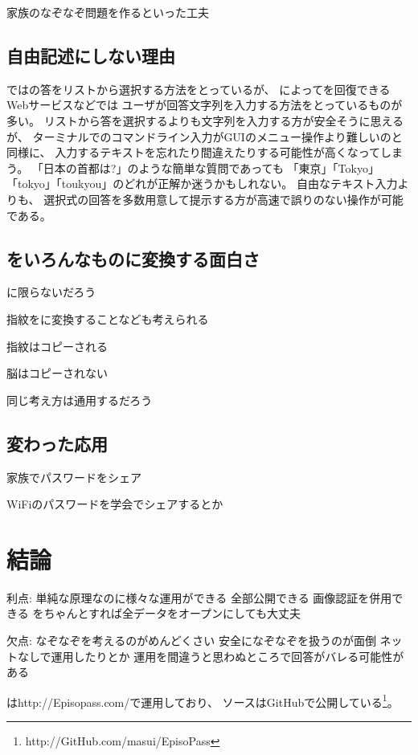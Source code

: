 \documentclass[twoside]{wiss}
\begin{document}
家族のなぞなぞ問題を作るといった工夫

\subsection{自由記述にしない理由}

{\EP}では{\SQ}の答をリストから選択する方法をとっているが、
{\SQ}によって{\PW}を回復できるWebサービスなどでは
ユーザが回答文字列を入力する方法をとっているものが多い。
リストから答を選択するよりも文字列を入力する方が安全そうに思えるが、
ターミナルでのコマンドライン入力がGUIのメニュー操作より難しいのと同様に、
入力するテキストを忘れたり間違えたりする可能性が高くなってしまう。
「日本の首都は?」のような簡単な質問であっても
「東京」「Tokyo」「tokyo」「toukyou」のどれが正解か迷うかもしれない。
自由なテキスト入力よりも、
選択式の回答を多数用意して提示する方が高速で誤りのない操作が可能である。


\subsection{{\EM}をいろんなものに変換する面白さ}

{\PW}に限らないだろう

指紋を{\PW}に変換することなども考えられる

指紋はコピーされる

脳はコピーされない

同じ考え方は通用するだろう

\subsection{変わった応用}

家族でパスワードをシェア

WiFiのパスワードを学会でシェアするとか

\section{結論}

利点:
単純な原理なのに様々な運用ができる
全部公開できる
画像認証を併用できる
{\SQ}をちゃんとすれば全データをオープンにしても大丈夫

欠点:
なぞなぞを考えるのがめんどくさい
安全になぞなぞを扱うのが面倒
  ネットなしで運用したりとか
運用を間違うと思わぬところで回答がバレる可能性がある

{\EP}は\textsf{http://Episopass.com/}で運用しており、
ソースはGitHubで公開している\footnote{
  \textsf{http://GitHub.com/masui/EpisoPass}
}。



\end{document}
